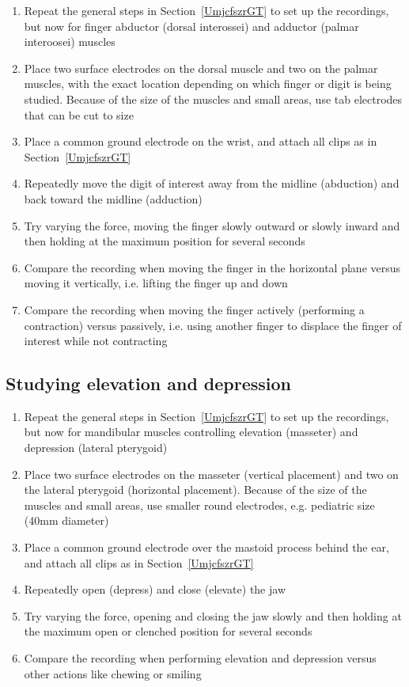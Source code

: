 \documentclass{article}
\begin{document}
\begin{enumerate}
\item Repeat the general steps in Section~\ref{UmjcfszrGT} to set up the recordings, but now for finger abductor (dorsal interossei) and adductor (palmar interoosei) muscles
\item Place two surface electrodes on the dorsal muscle and two on the palmar muscles, with the exact location depending on which finger or digit is being studied. Because of the size of the muscles and small areas, use tab electrodes that can be cut to size
\item Place a common ground electrode on the wrist, and attach all clips as in Section~\ref{UmjcfszrGT}
\item Repeatedly move the digit of interest away from the midline (abduction) and back toward the midline (adduction)
\item Try varying the force, moving the finger slowly outward or slowly inward and then holding at the maximum position for several seconds
\item Compare the recording when moving the finger in the horizontal plane versus moving it vertically, i.e. lifting the finger up and down
\item Compare the recording when moving the finger actively (performing a contraction) versus passively, i.e. using another finger to displace the finger of interest while not contracting
\end{enumerate}

\subsection{Studying elevation and depression}

\begin{enumerate}
\item Repeat the general steps in Section~\ref{UmjcfszrGT} to set up the recordings, but now for mandibular muscles controlling elevation (masseter) and depression (lateral pterygoid)
\item Place two surface electrodes on the masseter (vertical placement) and two on the lateral pterygoid (horizontal placement). Because of the size of the muscles and small areas, use smaller round electrodes, e.g. pediatric size (40mm diameter)
\item Place a common ground electrode over the mastoid process behind the ear, and attach all clips as in Section~\ref{UmjcfszrGT}
\item Repeatedly open (depress) and close (elevate) the jaw
\item Try varying the force, opening and closing the jaw slowly and then holding at the maximum open or clenched position for several seconds
\item Compare the recording when performing elevation and depression versus other actions like chewing or smiling
\end{enumerate}

\clearpage

\end{document}
